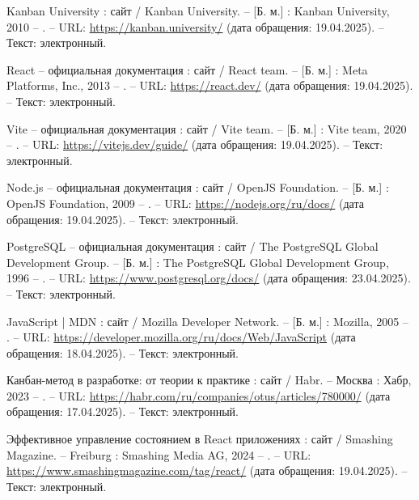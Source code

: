 \begin{thebibliography}{99}
	 Kanban University : сайт / Kanban University. – [Б. м.] : Kanban University, 2010 – . – URL: \url{https://kanban.university/} (дата обращения: 19.04.2025). – Текст: электронный.
	
	 React – официальная документация : сайт / React team. – [Б. м.] : Meta Platforms, Inc., 2013 – . – URL: \url{https://react.dev/} (дата обращения: 19.04.2025). – Текст: электронный.
	
	 Vite – официальная документация : сайт / Vite team. – [Б. м.] : Vite team, 2020 – . – URL: \url{https://vitejs.dev/guide/} (дата обращения: 19.04.2025). – Текст: электронный.
	
	 Node.js – официальная документация : сайт / OpenJS Foundation. – [Б. м.] : OpenJS Foundation, 2009 – . – URL: \url{https://nodejs.org/ru/docs/} (дата обращения: 19.04.2025). – Текст: электронный.
	
	 PostgreSQL – официальная документация : сайт / The PostgreSQL Global Development Group. – [Б. м.] : The PostgreSQL Global Development Group, 1996 – . – URL: \url{https://www.postgresql.org/docs/} (дата обращения: 23.04.2025). – Текст: электронный.
	
	 JavaScript | MDN : сайт / Mozilla Developer Network. – [Б. м.] : Mozilla, 2005 – . – URL: \url{https://developer.mozilla.org/ru/docs/Web/JavaScript} (дата обращения: 18.04.2025). – Текст: электронный.
	
	 Канбан-метод в разработке: от теории к практике : сайт / Habr. – Москва : Хабр, 2023 – . – URL: \url{https://habr.com/ru/companies/otus/articles/780000/} (дата обращения: 17.04.2025). – Текст: электронный.
	
	 Эффективное управление состоянием в React приложениях : сайт / Smashing Magazine. – Freiburg : Smashing Media AG, 2024 – . – URL: \url{https://www.smashingmagazine.com/tag/react/} (дата обращения: 19.04.2025). – Текст: электронный.
	
\end{thebibliography}
